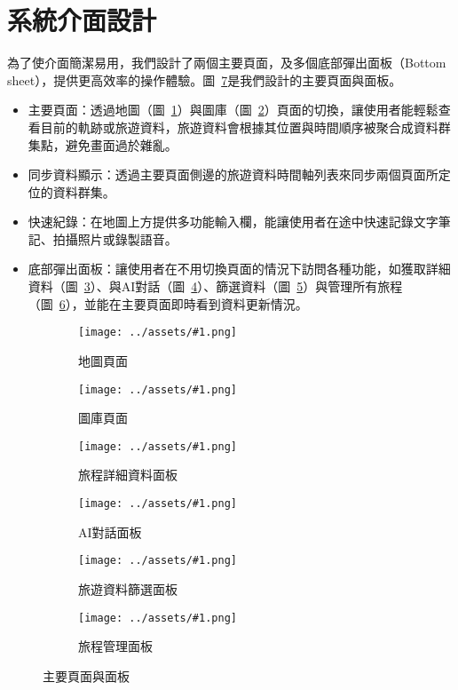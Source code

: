 
\newcommand{\customsubfig}[2]{
  \hspace{0.005\textwidth}
  \begin{subfigure}[t]{0.16\textwidth}
    \centering
    \texttt{[image: ../assets/\#1.png]}
    \caption{#2}
    \label{#2}
  \end{subfigure}
  \hspace{0.005\textwidth}
}

\section{系統介面設計}

為了使介面簡潔易用，我們設計了兩個主要頁面，及多個底部彈出面板（Bottom sheet），提供更高效率的操作體驗。圖~\ref{主要頁面與面板}是我們設計的主要頁面與面板。

\begin{itemize}
  \item 主要頁面：透過地圖（圖~\ref{地圖頁面}）與圖庫（圖~\ref{圖庫頁面}）頁面的切換，讓使用者能輕鬆查看目前的軌跡或旅遊資料，旅遊資料會根據其位置與時間順序被聚合成資料群集點，避免畫面過於雜亂。
  \item 同步資料顯示：透過主要頁面側邊的旅遊資料時間軸列表來同步兩個頁面所定位的資料群集。
  \item 快速紀錄：在地圖上方提供多功能輸入欄，能讓使用者在途中快速記錄文字筆記、拍攝照片或錄製語音。
  \item 底部彈出面板：讓使用者在不用切換頁面的情況下訪問各種功能，如獲取詳細資料（圖~\ref{旅程詳細資料面板}）、與AI對話（圖~\ref{AI對話面板}）、篩選資料（圖~\ref{旅遊資料篩選面板}）與管理所有旅程（圖~\ref{旅程管理面板}），並能在主要頁面即時看到資料更新情況。
\end{itemize}

\begin{figure}[H]
  \centering
  \customsubfig{地圖頁面}{地圖頁面}
  \customsubfig{圖庫頁面}{圖庫頁面}
  \customsubfig{旅程詳細資料面板-統計資料}{旅程詳細資料面板}
  \customsubfig{AI對話面板-聊天}{AI對話面板}
  \customsubfig{旅遊資料篩選面板}{旅遊資料篩選面板}
  \customsubfig{旅程管理面板}{旅程管理面板}
  \caption{主要頁面與面板}
  \label{主要頁面與面板}
\end{figure}
